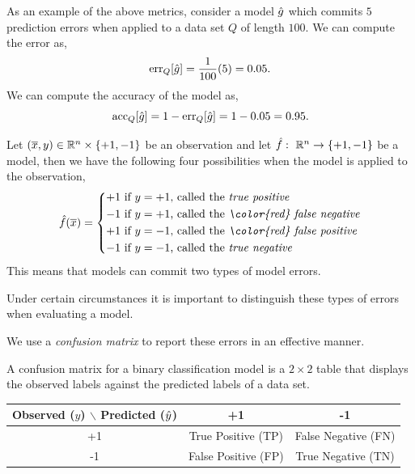 \documentclass[a4paper,blends,pdf,colorBG,slideColor]{prosper}
\begin{document}
As an example of the above metrics, consider a model $\hat{g}$ which commits $5$ prediction errors when applied to
a data set $Q$ of length $100$.  We can compute the error as,
\begin{equation*}
\mbox{err}_Q[\hat{g}] = \frac{1}{100}(5) = 0.05.
\end{equation*}
We can compute the accuracy of the model as,
\begin{equation*}
\mbox{acc}_Q[\hat{g}] = 1 - \mbox{err}_Q[\hat{g}] = 1 - 0.05 = 0.95.
\end{equation*}
\es

Let $(\overline{x}, y) \in \mathbb{R}^{n}\times\{+1,-1\}$ be an observation and let $\hat{f}\,\colon\; \mathbb{R}^{n} \rightarrow\{+1,-1\}$ be a model, then
we have the following four possibilities when the model is applied to the observation,
\begin{equation*}
\model{f}(\ol{x}) = \left \{
	\begin{aligned}
	+1 & \text{ if $y = +1$, called the {\em true positive}}\\
	-1 & \text{ if $y = +1$, called the {\em\color{red} false negative}}\\
	+1 & \text{ if $y = -1$, called the {\em\color{red} false positive}}\\
	-1 & \text{ if $y = -1$, called the {\em true negative}}\\
	\end{aligned}
\right .
\end{equation*}
This means that models can commit two types of model errors.

Under certain circumstances it is important to distinguish these types of errors when evaluating a
model.

We use a {\em confusion matrix} to report these errors in an effective manner.

\es

\small
A confusion matrix for a binary classification model is a $2\times2$ table that displays the observed labels against the 
predicted labels of a data set.  

\begin{center}
\scriptsize
   \begin{tabular}{ccc}
      \toprule
  Observed ($y$) $\backslash$ Predicted ($\hat{y}$) & +1 & -1 \\
     \midrule
      +1      & True Positive (TP) & False Negative (FN)  \\
      -1 & False Positive (FP) & True Negative  (TN) \\
      \bottomrule
   \end{tabular}
\end{center}
   
\end{document}
